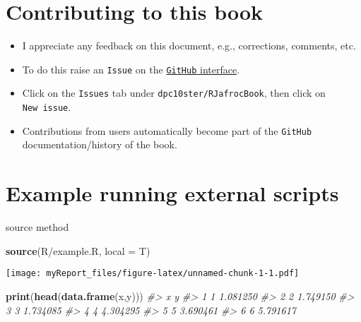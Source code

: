 \documentclass[
]{book}
\newenvironment{Shaded}{\begin{snugshade}}{\end{snugshade}}
\newcommand{\CommentTok}[1]{\textcolor[rgb]{0.56,0.35,0.01}{\textit{#1}}}
\newcommand{\DataTypeTok}[1]{\textcolor[rgb]{0.13,0.29,0.53}{#1}}
\newcommand{\KeywordTok}[1]{\textcolor[rgb]{0.13,0.29,0.53}{\textbf{#1}}}
\newcommand{\NormalTok}[1]{#1}
\newcommand{\StringTok}[1]{\textcolor[rgb]{0.31,0.60,0.02}{#1}}
\providecommand{\tightlist}{%
  \setlength{\itemsep}{0pt}\setlength{\parskip}{0pt}}
\begin{document}
\hypertarget{contributing-to-this-book}{%
\chapter*{Contributing to this book}\label{contributing-to-this-book}}

\begin{itemize}
\tightlist
\item
  I appreciate any feedback on this document, e.g., corrections, comments, etc.\\
\item
  To do this raise an \texttt{Issue} on the \href{https://github.com/dpc10ster/RJafrocBook}{\texttt{GitHub} interface}.
\item
  Click on the \texttt{Issues} tab under \texttt{dpc10ster/RJafrocBook}, then click on \texttt{New\ issue}.
\item
  Contributions from users automatically become part of the \texttt{GitHub} documentation/history of the book.
\end{itemize}

\hypertarget{example-running-external-scripts}{%
\chapter{Example running external scripts}\label{example-running-external-scripts}}

source method

\begin{Shaded}
\begin{Highlighting}[]
\KeywordTok{source}\NormalTok{(}\StringTok{\textquotesingle{}R/example.R\textquotesingle{}}\NormalTok{, }\DataTypeTok{local =}\NormalTok{ T)}
\end{Highlighting}
\end{Shaded}

\texttt{[image: myReport\_files/figure-latex/unnamed-chunk-1-1.pdf]}

\begin{Shaded}
\begin{Highlighting}[]
\KeywordTok{print}\NormalTok{(}\KeywordTok{head}\NormalTok{(}\KeywordTok{data.frame}\NormalTok{(x,y)))}
\CommentTok{\#\textgreater{}   x        y}
\CommentTok{\#\textgreater{} 1 1 1.081250}
\CommentTok{\#\textgreater{} 2 2 1.749150}
\CommentTok{\#\textgreater{} 3 3 1.734085}
\CommentTok{\#\textgreater{} 4 4 4.304295}
\CommentTok{\#\textgreater{} 5 5 3.690461}
\CommentTok{\#\textgreater{} 6 6 5.791617}
\end{Highlighting}
\end{Shaded}
\end{document}
